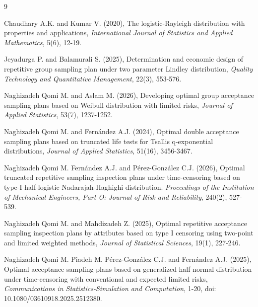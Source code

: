 \documentclass[twoside]{article}
\begin{document}

\begin{thebibliography}{9}


 Chaudhary A.K. and Kumar V. (2020), The logistic-Rayleigh distribution with properties and applications,
{\it International Journal of Statistics and Applied Mathematics}, 5(6), 12-19.

Jeyadurga P. and   Balamurali S. (2025), Determination and economic design of repetitive group sampling plan under two parameter Lindley distribution, {\it Quality Technology and  Quantitative  Management}, 22(3), 553-576.


  
 Naghizadeh Qomi M. and Aslam M. (2026), Developing optimal group acceptance sampling plans based on Weibull distribution with limited risks, {\it Journal of Applied Statistics}, 53(7), 1237-1252. 

 Naghizadeh Qomi M. and  Fern\'{a}ndez A.J. (2024), Optimal double acceptance sampling plans based on truncated life tests for Tsallis q-exponential distributions, {\it Journal of Applied Statistics},  51(16), 3456-3467. 


 Naghizadeh Qomi M. Fern\'{a}ndez A.J. and P\'{e}rez-Gonz\'{a}lez C.J. (2026), Optimal truncated repetitive sampling inspection plans under time-censoring based on type-I half-logistic Nadarajah-Haghighi distribution. {\it Proceedings of the Institution of Mechanical Engineers, Part O: Journal of Risk and Reliability}, 240(2), 527-539.


Naghizadeh Qomi M. and Mahdizadeh Z. (2025), Optimal repetitive acceptance sampling inspection plans by attributes based on type I censoring using two-point and limited weighted methods,  {\it  Journal of Statistical Sciences}, 19(1), 227-246.


 Naghizadeh Qomi M. Piadeh M.  P\'{e}rez-Gonz\'{a}lez C.J. and   Fern\'{a}ndez A.J. (2025), Optimal acceptance sampling plans based on generalized half-normal distribution under time-censoring with conventional and expected limited risks, {\it  Communications in Statistics-Simulation and Computation}, 1-20, doi: 10.1080/03610918.2025.2512380.



\end{thebibliography}
\end{document}
